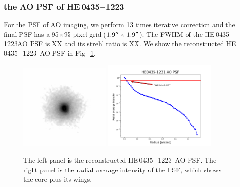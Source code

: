 \documentclass[useAMS,usenatbib]{mnras}
\newcommand\he{HE\,0435$-$1223}
\begin{document}
\subsubsection{the AO PSF of \he}
For the PSF of AO imaging, we perform 13 times iterative correction and the final PSF has a 95$\times$95 pixel grid ($1.9\hbox{$^{\prime\prime}$}\times1.9\hbox{$^{\prime\prime}$}$). The FWHM of the \he AO PSF is XX and its strehl ratio is XX. We show the reconstructed \he~AO PSF in Fig.~\ref{fig:HE0435_AO_PSF}. 
\begin{figure}
  \centering
  \includegraphics[width=0.4\textwidth, clip]{HE0435_AO_PSF3.png}
  \includegraphics[width=0.5\textwidth, clip]{HE0435_PSF_radius.png}
  \caption{The left panel is the reconstructed \he~AO PSF. The right panel is the radial average intensity of the PSF, which shows the core plus its wings.}
\label{fig:HE0435_AO_PSF}
\end{figure}
\end{document}
